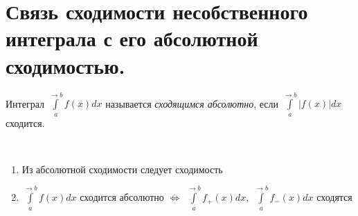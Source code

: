 \documentclass[../main.tex]{subfiles}
\begin{document}
\newpage
\section{Связь сходимости несобственного интеграла с его абсолютной сходимостью.}
Интеграл \( \displaystyle\int\limits_{ a}^{ \rightarrow b} f\left( x\right)dx\) называется \emph{сходящимся абсолютно}, если \( \displaystyle\int\limits_{ a}^{ \rightarrow b } \left| f\left( x\right)\right|dx\) сходится.

\begin{thm}
    
    ~

    \begin{enumerate}
        \item Из абсолютной сходимости следует сходимость
        \item \( \displaystyle\int\limits_{ a}^{ \rightarrow b} f\left( x\right)dx\) сходится абсолютно \( \Longleftrightarrow\) \( \displaystyle\int\limits_{ a}^{ \rightarrow b} f_+\left( x\right)dx, \;\displaystyle\int\limits_{ a}^{ \rightarrow b} f_-\left( x\right)dx\) сходятся
    \end{enumerate}
\end{thm}
\end{document}
